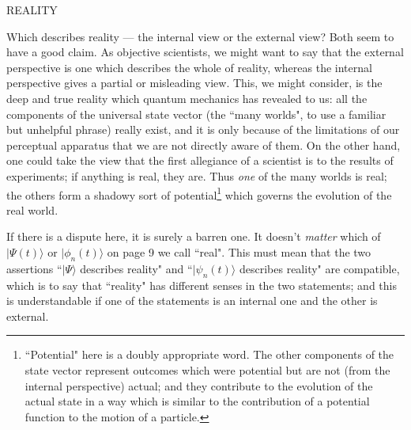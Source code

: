 \documentclass[12pt,a4paper,reqno]{article}
\renewcommand{\(}{\left(}
\renewcommand{\)}{\right)}
\newcommand{\<}{\langle}
\renewcommand{\>}{\rangle}
\theoremstyle{plain} %
\theoremstyle{definition}
\theoremstyle{remark}
\begin{document}
\medskip
\begin{center}
REALITY
\end{center}

Which describes reality --- the internal view or the external view? Both
seem to have a good claim. As objective scientists, we might want to say
that the  external perspective is one which describes the whole of
reality, whereas the internal perspective gives a partial or misleading
view. This, we might consider, is the deep and true reality which
quantum mechanics has revealed to us: all the components of the
universal state vector (the ``many worlds", to use a familiar but
unhelpful phrase) really exist, and it is only because of the
limitations of our perceptual apparatus that we are not directly aware
of them. On the other hand, one could take the view that the first
allegiance of a scientist is to the results of experiments; if anything
is real, they are. Thus \emph{one} of the many worlds is real; the
others form a shadowy sort of potential\footnote{``Potential" here is a doubly
appropriate word. The other components of the state vector represent
outcomes which were potential but are not (from the internal
perspective) actual; and they contribute to the evolution of the actual
state in a way which is similar to the contribution of a potential
function to the motion of a particle.} which governs
the evolution of the real world.  

If there is a dispute here, it is surely a barren one. It doesn't
\emph{matter} which of $|\Psi(t)\>$ or $|\phi_n(t)\>$ on page 9 we call
``real". This must mean that the two assertions ``$|\Psi\>$  describes
reality" and ``$|\psi_n(t)\>$ describes reality" are compatible, which
is to say that ``reality" has different senses in the two statements;
and this is understandable if one of the statements is an internal one
and the other is external.
\end{document}
